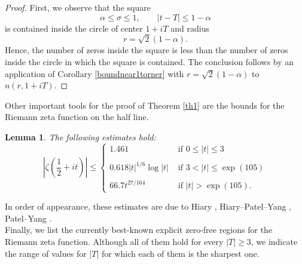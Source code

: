 \documentclass[reqno]{amsart}
\newtheorem{lemma}[theorem]{Lemma}
\numberwithin{equation}{section}
\theoremstyle{remark}
\begin{document}
\begin{proof}
First, we observe that the square
\[
\alpha\le \sigma\le 1,\qquad |t-T|\le 1-\alpha
\]
is contained inside the circle of center $1+iT$ and radius 
\[
r=\sqrt{2}(1-\alpha).
\]
Hence, the number of zeros inside the square is less than the number of zeros inside the circle in which the square is contained. The conclusion follows by an application of Corollary \ref{boundnear1torner} with $r=\sqrt{2}(1-\alpha)$ to $n(r,1+iT)$.

\end{proof}
Other important tools for the proof of Theorem \ref{th1} are the bounds for the Riemann zeta function on the half line. 
\begin{lemma}\label{onehalf}
The following estimates hold:
    \begin{equation*}
\left|\zeta\left(\frac{1}{2}+i t\right)\right| \leq\left\{\begin{array}{ll}
1.461 & \text { if } 0 \leq|t| \leq 3 \\ \\
0.618|t|^{1 / 6} \log |t| & \text { if }3<|t| \le \exp(105)\\ \\
 66.7 t^{27 / 164}  & \text { if } |t| > \exp(105).
\end{array}\right.
\end{equation*}
\end{lemma}
In order of appearance, these estimates are due to Hiary \cite{hiary_explicit_2016}, Hiary--Patel--Yang \cite{hiary_improved_2024}, Patel--Yang \cite{patel2023explicit}.\\
 Finally, we list the currently best-known explicit zero-free regions for the Riemann zeta function. Although all of them hold for every $|T|\ge 3$, we indicate the range of values for $|T|$ for which each of them is the sharpest one.
\end{document}
